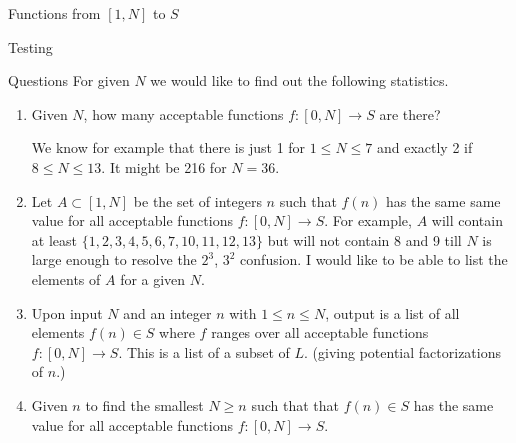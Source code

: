 \documentclass{article}
\begin{document}
\begin{section}{Functions from $[1, N]$ to $S$}
\begin{subsubsection}{Testing}
\end{subsubsection}

\begin{subsubsection}{Questions}
For given $N$ we would like to find out the following statistics.

\begin{enumerate}
\item Given $N$, how many  acceptable functions   $f: [0, N] \rightarrow S$ are there? 

We know for example  that there is just 1 for $1\le N\le 7$ and exactly 2 if $8\le N\le 13$.   It might be 216 for $N=36$. 

\item  Let $A\subset [1, N]$  be the set of integers $n$ such that $f(n)$ has the same same value for all acceptable functions $f: [0, N] \rightarrow S$.  For example, $A$ will contain at least $\{1, 2, 3, 4, 5, 6, 7, 10, 11, 12, 13\}$ but will not contain 8 and 9 till $N$ is large enough to resolve the $2^3$, $3^2$ confusion.  I would like to be able to list the elements of $A$ for a given $N$.


\item Upon input $N$ and an integer $n$ with $1\le n\le N$, output is a list of all elements $f(n)\in S$ where $f$ ranges over all acceptable functions $f: [0, N] \rightarrow S$. This is a list of a subset of $L$. (giving potential factorizations of $n$.)

\item Given $n$ to find the smallest $N \ge n$ such that that $f(n)\in S$ has the same value for all acceptable functions $f: [0, N] \rightarrow S$.


\end{enumerate}


\end{subsubsection}



\end{section}
\end{document}
